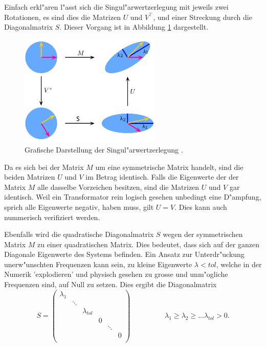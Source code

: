 \begin{refsection}
Einfach erkl"aren l"asst sich die Singul"arwertzerlegung mit jeweils zwei Rotationen, es sind dies die Matrizen $U$ und $V^\top$, und einer Streckung durch die Diagonalmatrix $S$. Dieser Vorgang ist in Abbildung \ref{trafo:SVDFig} dargestellt. 

\begin{figure}
	\centering
	\includegraphics[width=0.6\textwidth]{./trafo/images/svd.png}
	\caption{Grafische Darstellung der Singul"arwertzerlegung \cite{trafo:SVDWiki}.}
	\label{trafo:SVDFig}
\end{figure}

Da es sich bei der Matrix $M$ um eine symmetrische Matrix handelt, sind die beiden Matrizen $U$ und $V$ im Betrag identisch. Falls die Eigenwerte der der Matrix $M$ alle dasselbe Vorzeichen besitzen, sind die Matrizen $U$ und $V$ gar identisch. Weil ein Transformator rein logisch gesehen unbedingt eine D"ampfung, sprich alle Eigenwerte negativ, haben muss, gilt $U = V$. Dies kann auch nummerisch verifiziert werden.

Ebenfalls wird die quadratische Diagonalmatrix $S$ wegen der symmetrischen Matrix $M$ zu einer quadratischen Matrix. Dies bedeutet, dass sich auf der ganzen Diagonale Eigenwerte des Systems befinden. Ein Ansatz zur Unterdr"uckung unerw"unschten Frequenzen kann sein, zu kleine Eigenwerte $\lambda < tol$, welche in der Numerik 'explodieren' und physisch gesehen zu grosse und unm"ogliche Frequenzen sind, auf Null zu setzen. Dies ergibt die Diagonalmatrix 
\begin{equation*}
	S = \left( 
			\begin{array}{cccccc}
				\lambda_1 & & & & & \\
				& \ddots & & & &  \\
				& & \lambda_{tol} & & & \\
				& & & 0 & & \\
				& & & & \ddots & \\
				& & & & & 0 \\				
				\end{array}
			\right) 
			\hspace{2cm}\lambda_1 \geq \lambda_2 \geq \dots \lambda_{tol} > 0. 
\end{equation*}



\end{refsection}
